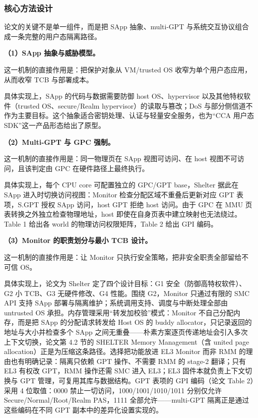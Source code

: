 \documentclass[11pt]{ctexart}
\begin{document}
\subsubsection{核心方法设计}
论文的关键不是单一组件，而是把 SApp 抽象、multi-GPT 与系统交互协议组合成一条完整的用户态隔离路径。\par
\noindent\textbf{（1）SApp 抽象与威胁模型。}\par
这一机制的直接作用是：把保护对象从 VM/trusted OS 收窄为单个用户态应用，从而收窄 TCB 与部署成本。\par
具体实现上，SApp 的代码与数据需要防御 host OS、hypervisor 以及其他特权软件（trusted OS、secure/Realm hypervisor）的读取与篡改；DoS 与部分侧信道不作为主要目标。这个抽象适合密钥处理、认证与轻量安全服务，也为“CCA 用户态 SDK”这一产品形态给出了原型。\par
\noindent\textbf{（2）Multi-GPT 与 GPC 强制。}\par
这一机制的直接作用是：同一物理页在 SApp 视图可访问、在 host 视图不可访问，且该判定由 GPC 在硬件路径上最终执行。\par
具体实现上，每个 CPU core 可配置独立的 GPC/GPT base，Shelter 据此在 SApp 进入时切换访问视图：Monitor 检查分配区域不重叠后更新对应 GPT 表项，S.GPT 授权 SApp 访问，host GPT 拒绝 host 访问。由于 GPC 在 MMU 页表转换之外独立检查物理地址，host 即使在自身页表中建立映射也无法绕过。Table 1 给出各 world 的物理访问权限矩阵，Table 2 给出 GPI 编码。\par
\noindent\textbf{（3）Monitor 的职责划分与最小 TCB 设计。}\par
这一机制的直接作用是：让 Monitor 只执行安全策略，把非安全职责全部留给不可信 OS。\par
具体实现上，论文为 Shelter 定了四个设计目标：G1 安全（防御高特权软件）、G2 小 TCB、G3 无硬件修改、G4 性能。围绕 G2，Monitor 只通过有限的 SMC API 支持 SApp 部署与隔离维护；系统调用支持、调度与中断处理全部由 untrusted OS 承担。内存管理采用“转发加校验”模式：Monitor 不自己分配内存，而是把 SApp 的分配请求转发给 Host OS 的 buddy allocator，只记录返回的地址与大小并检查多个 SApp 之间无重叠——朴素方案逐页传递地址会引入多次上下文切换，论文第 4.2 节的 SHELTER Memory Management（含 united page allocation）正是为压缩这条路径。选择把功能放进 EL3 Monitor 而非 RMM 的理由也有明确记录：隔离只依赖 GPT 操作、不需要 RMM 的 stage-2 翻译；只有 EL3 有权改 GPT，RMM 操作还需 SMC 进入 EL3；EL3 固件本就负责上下文切换与 GPT 管理，可复用其库与数据结构。GPT 表项的 GPI 编码（论文 Table 2）采用 4 位取值：0000 禁止一切访问，1000/1001/1010/1011 分别仅允许 Secure/Normal/Root/Realm PAS，1111 全部允许——multi-GPT 隔离正是通过这些编码在不同 GPT 副本中的差异化设置实现的。\par
\end{document}
